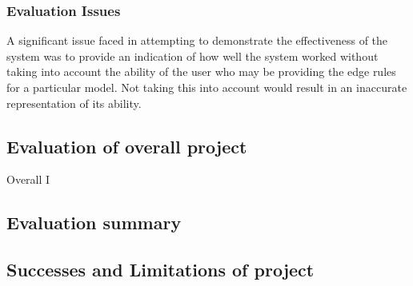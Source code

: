 \subsubsection{Evaluation Issues}
A significant issue faced in attempting to demonstrate the effectiveness of the system was to provide an indication of how well the system worked without taking into account the ability of the user who may be providing the edge rules for a particular model. Not taking this into account would result in an inaccurate representation of its ability.

\subsection{Evaluation of overall project}

Overall I
% 


\subsection{Evaluation summary}



\subsection{Successes and Limitations of project}

